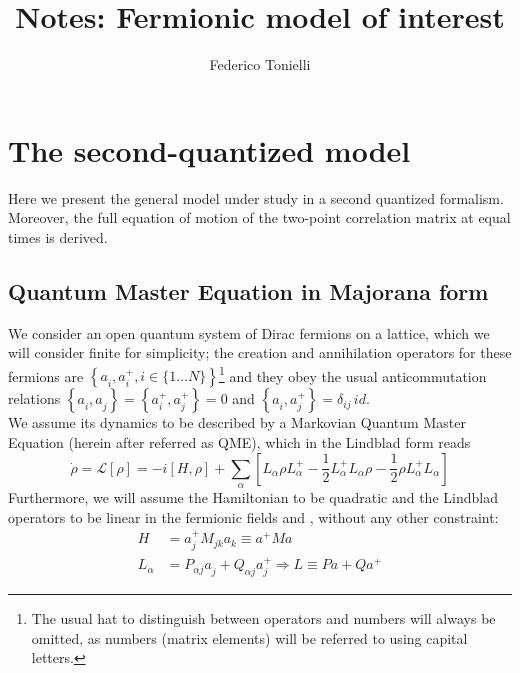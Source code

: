 \documentclass[a4paper,11pt]{article}
\title{Notes: Fermionic model of interest}
\author{Federico Tonielli}
\newcommand\blankpage{%
    \null
    \thispagestyle{empty}%
    \addtocounter{page}{-1}%
    \newpage}
\newcommand{\ro}{\rho}
\begin{document}
 \maketitle
 
 \tableofcontents
 \blankpage
 
 \section{The second-quantized model}
 Here we present the general model under study in a second quantized formalism.  Moreover, the full equation of motion of the two-point correlation matrix at equal times is derived.
 
  \subsection{Quantum Master Equation in Majorana form}
   We consider an open quantum system of Dirac fermions on a lattice, which we will consider finite for simplicity; the creation and annihilation operators for these fermions are $\left \{ a_i^{ },a_i^+, i\in \{1\dots N\} \right \} $\footnote{ The usual hat to distinguish between operators and numbers will always be omitted, as numbers (matrix elements) will be referred to using capital letters.} and they obey the usual anticommutation relations $\left\{a_i^{ },a_j^{ }\right\} = \left\{a_i^{+},a_j^+\right \}=0$ and $\left\{a_i^{ },a_j^+\right \} = \delta_{ij}\,id $.\\  We assume its dynamics to be described by a Markovian Quantum Master Equation (herein after referred as QME), which in the Lindblad form reads
  \[\dot{\ro}=\mathcal{L}[\ro]=-i\left[H,\ro\right]+\sum_{\alpha}\left[L_{\alpha}^{ }\ro L_{\alpha}^+ - \frac{1}{2}L_{\alpha}^+L_{\alpha}^{ }\ro - \frac{1}{2}\ro L_{\alpha}^+L_{\alpha}^{ }\right]  \]
  Furthermore, we will assume the Hamiltonian to be quadratic and the Lindblad operators to be linear in the fermionic fields  and , without any other constraint: 
  \begin{subequations}        %
  \label{eq:quadr_dyn}         %
  \begin{align}
   H & = a_j^+M_{jk}a_k^{ } \equiv a^+Ma \label{eq:quadr_ham}\\         %
   L_{\alpha} & = P^{ }_{\alpha j}a_j^{ } + Q^{ }_{\alpha j}a_j^+ \Rightarrow L \equiv P a + Q a^+ \label{eq:quadr_lindb}
  \end{align}
  \end{subequations}
\end{document}

